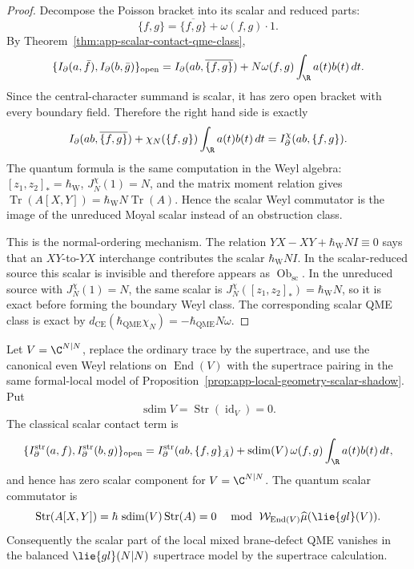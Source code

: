 \begin{proof}
  Decompose the Poisson bracket into its scalar and reduced parts:
  \[
    \{f,g\}=\overline{\{f,g\}}+\omega(f,g)\cdot1 .
  \]
  By Theorem~\ref{thm:app-scalar-contact-qme-class},
  \[
    \{I_\partial(a,\bar f),I_\partial(b,\bar g)\}_{\mathrm{open}}
      =
    I_\partial(ab,\overline{\{f,g\}})
      +N\omega(f,g)\int_\R a(t)b(t)\,dt .
  \]
  Since the central-character summand is scalar, it has zero open
  bracket with every boundary field.  Therefore the right hand side is
  exactly
  \[
    I_\partial(ab,\overline{\{f,g\}})
    +\chi_N(\{f,g\})\int_\R a(t)b(t)\,dt
    =
    I^\chi_\partial(ab,\{f,g\}).
  \]
  The quantum formula is the same computation in the Weyl algebra:
  \([z_1,z_2]_{*}=\hbar_{\mathrm{W}}\), \(J^\chi_N(1)=N\), and the matrix moment
  relation gives
  \(\operatorname{Tr}(A[X,Y])
    =\hbar_{\mathrm{W}}N\operatorname{Tr}(A)\).  Hence the
  scalar Weyl commutator is the image of the unreduced Moyal scalar
  instead of an obstruction class.

  This is the normal-ordering mechanism.  The relation
  \(YX-XY+\hbar_{\mathrm{W}}N I\equiv0\) says that an \(XY\)-to-\(YX\) interchange
  contributes the scalar \(\hbar_{\mathrm{W}}N I\).  In the scalar-reduced source
  this scalar is invisible and therefore appears as
  \(\operatorname{Ob}_{\mathrm{sc}}\).  In the unreduced source with
  \(J_N^\chi(1)=N\), the same scalar is
  \(J_N^\chi([z_1,z_2]_*)=\hbar_{\mathrm{W}}N\), so it is exact before
  forming the boundary Weyl class.  The corresponding scalar QME class
  is exact by
  \(d_{\mathrm{CE}}(\hbar_{\mathrm{QME}}\chi_N)
    =-\hbar_{\mathrm{QME}}N\omega\).
\end{proof}

\begin{thm}
\label{thm:app-balanced-supertrace-qme-cancellation}
  Let \(V=\C^{N|N}\), replace the ordinary trace by the supertrace, and
  use the canonical even Weyl relations on \(\operatorname{End}(V)\)
  with the supertrace pairing in the same formal-local model of
  Proposition~\ref{prop:app-local-geometry-scalar-shadow}.  Put
  \[
    \operatorname{sdim}V=\operatorname{Str}(\operatorname{id}_V)=0 .
  \]
  The classical scalar contact term is
  \[
    \{I^{\operatorname{str}}_\partial(a,f),
      I^{\operatorname{str}}_\partial(b,g)\}_{\mathrm{open}}
    =
    I^{\operatorname{str}}_\partial(ab,\{f,g\}_{\bar A})
    +\operatorname{sdim}(V)\,
      \omega(f,g)\int_\R a(t)b(t)\,dt,
  \]
  and hence has zero scalar component for \(V=\C^{N|N}\).  The quantum
  scalar commutator is
  \[
    \operatorname{Str}(A[X,Y])
      =
    \hbar\,\operatorname{sdim}(V)\operatorname{Str}(A)
      =0
      \quad\bmod\ \mathcal W_{\operatorname{End}(V)}
             \widehat\mu(\lie{gl}(V)).
  \]
  Consequently the scalar part of the local mixed brane-defect QME
  vanishes in the balanced \(\lie{gl}(N|N)\) supertrace model by the
  supertrace calculation.
\end{thm}

